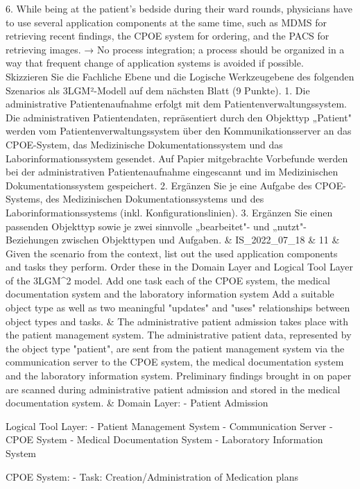 6. While being at the patient's bedside during their ward rounds, physicians have to use several application components at the same time, such as MDMS for retrieving recent findings, the CPOE system for ordering, and the PACS for retrieving images. → No process integration; a process should be organized in a way that frequent change of application systems is avoided if possible. \\
Skizzieren Sie die Fachliche Ebene und die Logische Werkzeugebene des folgenden Szenarios als 3LGM²-Modell auf dem nächsten Blatt (9 Punkte).
   1. Die administrative Patientenaufnahme erfolgt mit dem Patientenverwaltungssystem. Die administrativen Patientendaten, repräsentiert durch den Objekttyp „Patient" werden vom Patientenverwaltungssystem über den Kommunikationsserver an das CPOE-System, das Medizinische Dokumentationssystem und das Laborinformationssystem gesendet. Auf Papier mitgebrachte Vorbefunde werden bei der administrativen Patientenaufnahme eingescannt und im Medizinischen Dokumentationssystem gespeichert. 
   2. Ergänzen Sie je eine Aufgabe des CPOE-Systems, des Medizinischen Dokumentationssystems und des Laborinformationssystems (inkl. Konfigurationslinien).
   3. Ergänzen Sie einen passenden Objekttyp sowie je zwei sinnvolle „bearbeitet"- und „nutzt"-Beziehungen zwischen Objekttypen und Aufgaben. & IS_2022_07_18 & 11 & Given the scenario from the context, list out the used application components and tasks they perform. Order these in the Domain Layer and Logical Tool Layer of the 3LGM^2 model.
Add one task each of the CPOE system, the medical documentation system and the laboratory information system
Add a suitable object type as well as two meaningful "updates" and "uses" relationships between object types and tasks. & The administrative patient admission takes place with the patient management system. The administrative patient data, represented by the object type "patient", are sent from the patient management system via the communication server to the CPOE system, the medical documentation system and the laboratory information system. Preliminary findings brought in on paper are scanned during administrative patient admission and stored in the medical documentation system. & Domain Layer:
- Patient Admission

Logical Tool Layer:
- Patient Management System
- Communication Server
- CPOE System
- Medical Documentation System
- Laboratory Information System


CPOE System:
- Task: Creation/Administration of Medication plans

